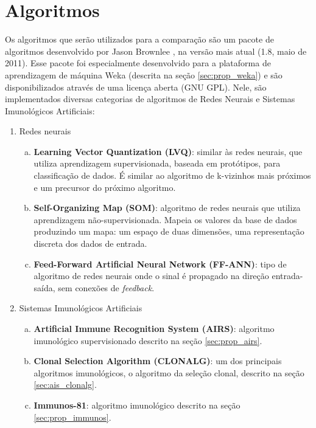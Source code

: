 \section{Algoritmos}

Os algoritmos que serão utilizados para a comparação são um pacote de algoritmos desenvolvido por Jason Brownlee \cite{Brownlee2011}, na versão mais atual (1.8, maio de 2011). Esse pacote foi especialmente desenvolvido para a plataforma de aprendizagem de máquina Weka (descrita na seção \ref{sec:prop_weka}) e são disponibilizados através de uma licença aberta (GNU GPL). Nele, são implementados diversas categorias de algoritmos de Redes Neurais e Sistemas Imunológicos Artificiais:

\begin{enumerate}
    \item Redes neurais
    \begin{enumerate}[a)]
        \item \textbf{Learning Vector Quantization (LVQ)}: similar às redes neurais, que utiliza aprendizagem supervisionada, baseada em protótipos, para classificação de dados. É similar ao algoritmo de k-vizinhos mais próximos e um precursor do próximo algoritmo.
        \item \textbf{Self-Organizing Map (SOM)}: algoritmo de redes neurais que utiliza aprendizagem não-supervisionada. Mapeia os valores da base de dados produzindo um mapa: um espaço de duas dimensões, uma representação discreta dos dados de entrada.
        \item \textbf{Feed-Forward Artificial Neural Network (FF-ANN)}: tipo de algoritmo de redes neurais onde o sinal é propagado na direção entrada-saída, sem conexões de \emph{feedback}.
    \end{enumerate}
    \item Sistemas Imunológicos Artificiais
    \begin{enumerate}[a)]
        \item \textbf{Artificial Immune Recognition System (AIRS)}: algoritmo imunológico supervisionado descrito na seção \ref{sec:prop_airs}.
        \item \textbf{Clonal Selection Algorithm (CLONALG)}: um dos principais algoritmos imunológicos, o algoritmo da seleção clonal, descrito na seção \ref{sec:ais_clonalg}.
        \item \textbf{Immunos-81}: algoritmo imunológico descrito na seção \ref{sec:prop_immunos}.
    \end{enumerate}
\end{enumerate}

